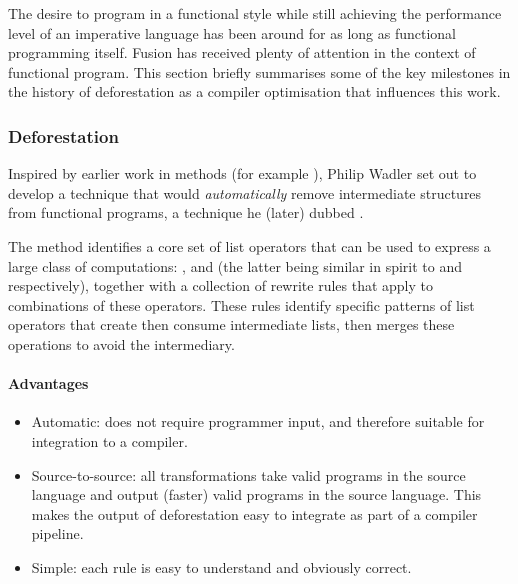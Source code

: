 The desire to program in a functional style while still achieving the
performance level of an imperative language has been around for as long as
functional programming itself. Fusion has received plenty of attention in the
context of functional program. This section briefly summarises some of the key
milestones in the history of deforestation as a compiler optimisation that
influences this work.

\subsubsection{Deforestation}

Inspired by earlier work in  methods (for example
\citet{Burstall:1977kl}), Philip Wadler set out to develop a technique that
would \emph{automatically} remove intermediate structures from functional
programs, a technique he (later) dubbed 
\cite{Wadler:1981hy,Wadler:1990ix}.

The method identifies a core set of list operators that can be used to express a
large class of computations: ,  and  (the
latter being similar in spirit to  and  respectively),
together with a collection of rewrite rules that apply to combinations of these
operators. These rules identify specific patterns of list operators that create
then consume intermediate lists, then merges these operations to avoid the
intermediary.

\paragraph{Advantages}
\begin{itemize}
    \item Automatic: does not require programmer input, and therefore suitable
        for integration to a compiler.

    \item Source-to-source: all transformations take valid programs in the
        source language and output (faster) valid programs in the source
        language. This makes the output of deforestation easy to integrate as
        part of a compiler pipeline.

    \item Simple: each rule is easy to understand and obviously correct.
\end{itemize}

